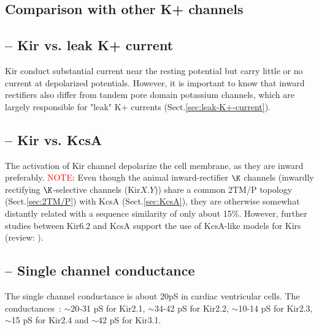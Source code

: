

\subsection{Comparison with other K+ channels}

\subsection{-- Kir vs. leak K+ current}

Kir conduct substantial current near the resting potential but carry little or
no current at depolarized potentials. However, it is important to know that
inward rectifiers also differ from tandem pore domain potassium channels, which
are largely responsible for "leak" K+ currents (Sect.\ref{sec:leak-K+-current}).

\subsection{-- Kir vs. KcsA}

The activation of Kir channel depolarize the cell membrane, as they are inward
preferably. \textcolor{red}{NOTE}: Even though the animal inward-rectifier $\K$
channels (inwardly rectifying $\K$-selective channels (Kir$X.Y$)) share a common
2TM/P topology (Sect.\ref{sec:2TM/P}) with KcsA (Sect.\ref{sec:KcsA}), they are
otherwise somewhat distantly related with a sequence similarity of only about
15\%. However, further studies between Kir6.2 and KcsA support the use of
KcsA-like models for Kirs (review: \citep{sansom2002}).



\subsection{-- Single channel conductance}

The single channel conductance is about 20pS in cardiac
ventricular cells. The conductances~\citep{Anumonwo2010}: $\sim$20-31 pS for
Kir2.1, $\sim$34-42 pS for Kir2.2, $\sim$10-14 pS for Kir2.3, $\sim$15 pS for
Kir2.4 and $\sim$42 pS for Kir3.1.


